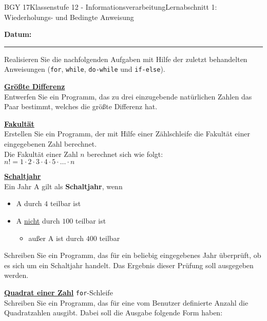 \documentclass[oneside,openany,headings=optiontotoc,11pt,numbers=noenddot]{scrreprt}
\begin{document}
	\begin{worksheet}{BGY 17}{Klassenstufe 12 - Informationsverarbeitung}{Lernabschnitt 1: Wiederholungs- und Bedingte Anweisung}
				
		\noindent
		\sffamily
		\textbf{Datum:}
		\rule{0.91\textwidth}{0.4pt}
		\begin{framed}
			\noindent
			Realisieren Sie die nachfolgenden Aufgaben mit Hilfe der zuletzt behandelten Anweisungen (\lstinline[style=JavaInputStyle]{for}, \lstinline[style=JavaInputStyle]{while}, \lstinline[style=JavaInputStyle]{do-while} und \lstinline[style=JavaInputStyle]{if-else}).\\
			\par\noindent
			\textbf{\underline{Größte Differenz}}\\
			Entwerfen Sie ein Programm, das zu drei einzugebende natürlichen Zahlen das Paar bestimmt, welches die größte Differenz hat.
			\par\bigskip\noindent
			\textbf{\underline{Fakultät}}\\
			Erstellen Sie ein Programm, der mit Hilfe einer Zählschleife die Fakultät einer eingegebenen Zahl berechnet.\\
			Die Fakultät einer Zahl \(n\) berechnet sich wie folgt:\\
			\(n! = 1\cdot{}2\cdot{}3\cdot{}4\cdot{}5\cdot{}\ldots\cdot{}n\)
			\par\bigskip\noindent
			\textbf{\underline{Schaltjahr}}\\
			Ein Jahr A gilt als \textbf{Schaltjahr}, wenn
			\begin{itemize}
				\item A durch \(4\) teilbar ist
				\item A \underline{nicht} durch \(100\) teilbar ist
				\begin{itemize}
					\item außer A ist durch \(400\) teilbar
				\end{itemize}
			\end{itemize}
			Schreiben Sie ein Programm, das für ein beliebig eingegebenes Jahr überprüft, ob es sich um ein Schaltjahr handelt. Das Ergebnis dieser Prüfung soll ausgegeben werden.\\
			\par\bigskip\noindent
			\textbf{\underline{Quadrat einer Zahl}} \lstinline[style=JavaInputStyle]{for}-Schleife\\
			Schreiben Sie ein Programm, das für eine vom Benutzer definierte Anzahl die Quadratzahlen ausgibt. Dabei soll die Ausgabe folgende Form haben:\\

\end{framed}
\end{worksheet}
\end{document}
